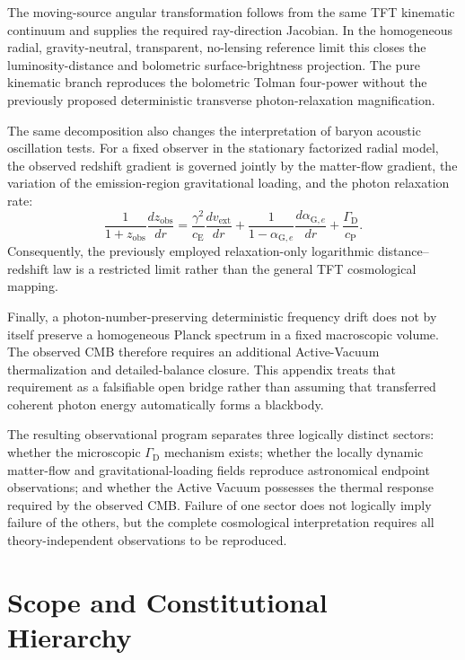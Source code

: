 The moving-source angular transformation follows from the same TFT kinematic
continuum and supplies the required ray-direction Jacobian. In the homogeneous radial, gravity-neutral,
transparent, no-lensing reference limit this closes the luminosity-distance
and bolometric surface-brightness projection. The pure kinematic branch reproduces the
bolometric Tolman four-power without the previously proposed deterministic
transverse photon-relaxation magnification.

The same decomposition also changes the interpretation of baryon acoustic
oscillation tests. For a fixed observer in the stationary factorized radial
model, the observed redshift gradient is governed jointly by the matter-flow
gradient, the variation of the emission-region gravitational loading, and the
photon relaxation rate:
\begin{equation}
    \boxed{
    \frac{1}{
        1+z_{\mathrm{obs}}
    }
    \frac{dz_{\mathrm{obs}}}{dr}
    =
    \frac{\gamma^2}{c_{\mathrm E}}
    \frac{dv_{\mathrm{ext}}}{dr}
    +
    \frac{1}{
        1-\alpha_{\mathrm G,e}
    }
    \frac{d\alpha_{\mathrm G,e}}{dr}
    +
    \frac{\Gamma_{\mathrm D}}{c_{\mathrm P}}.
    }
\end{equation}
Consequently, the previously employed relaxation-only logarithmic
distance--redshift law is a restricted limit rather than the general TFT
cosmological mapping.

Finally, a photon-number-preserving deterministic frequency drift does not by
itself preserve a homogeneous Planck spectrum in a fixed macroscopic volume.
The observed CMB therefore requires an additional Active-Vacuum
thermalization and detailed-balance closure. This appendix treats that
requirement as a falsifiable open bridge rather than assuming that transferred
coherent photon energy automatically forms a blackbody.

The resulting observational program separates three logically distinct
sectors: whether the microscopic \(\Gamma_{\mathrm D}\) mechanism exists;
whether the locally dynamic matter-flow and gravitational-loading fields
reproduce astronomical endpoint observations; and whether the Active Vacuum
possesses the thermal response required by the observed CMB. Failure of one
sector does not logically imply failure of the others, but the complete
cosmological interpretation requires all theory-independent observations to
be reproduced.


\section{Scope and Constitutional Hierarchy}

